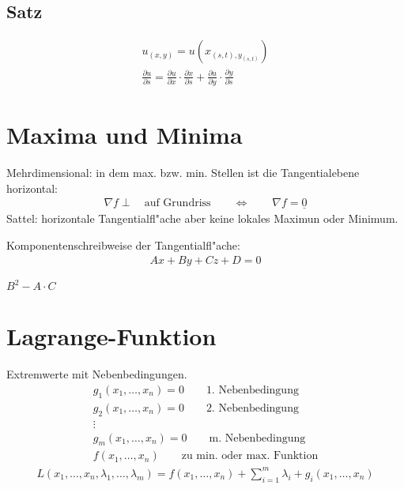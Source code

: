 \subsection{Satz}
\begin{gather}
	u_{(x,y)} = u\left(x_{(s,t), y_{(s,t)}}\right) \\
	\frac{\partial u}{\partial s} = \frac{\partial u}{\partial x}\cdot\frac{\partial x}{\partial s}
		+ \frac{\partial u}{\partial y}\cdot\frac{\partial y}{\partial s}
\end{gather}

\section{Maxima und Minima}
Mehrdimensional: in dem max. bzw. min. Stellen ist die Tangentialebene horizontal:
\begin{gather}
	\nabla f \perp\quad\text{auf Grundriss} \qquad\Longleftrightarrow\qquad\nabla f = \underline{0}
\end{gather}
Sattel: horizontale Tangentialfl"ache aber keine lokales Maximun oder Minimum.

Komponentenschreibweise der Tangentialfl"ache:
\begin{gather}
	Ax + By + Cz + D = 0
\end{gather}
\begin{center}
\setlength{\GapDepth}{5mm}
\begin{bundle}{$B^2-A\cdot C$}
\end{bundle}
\end{center}

\section{Lagrange-Funktion}
Extremwerte mit Nebenbedingungen.
\begin{gather*}
	g_1(x_1, \ldots, x_n) = 0\qquad\text{1. Nebenbedingung} \\
	g_2(x_1, \ldots, x_n) = 0\qquad\text{2. Nebenbedingung} \\
	\vdots \\
	g_m(x_1, \ldots, x_n) = 0\qquad\text{m. Nebenbedingung} \\
	f(x_1, \ldots, x_n) \qquad\text{zu min. oder max. Funktion}
\end{gather*}
\begin{gather}
	L(x_1, \ldots, x_n, \lambda_1, \ldots , \lambda_m) =
		f(x_1, \ldots , x_n) + \sum_{i=1}^m \lambda_i + g_i(x_1, \ldots , x_n)
\end{gather}

